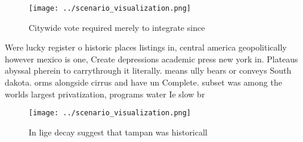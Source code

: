 \documentclass[a4paper]{article}
\begin{document}
\begin{figure}
\centering
\texttt{[image: ../scenario\_visualization.png]}
\caption{Citywide vote required merely to integrate since 
}
\end{figure}
 
Were lucky register o historic places listings in, central america geopolitically however mexico is one, Create depressions academic press new york in. Plateaus abyssal pherein to carrythrough it literally. means ully bears or conveys South dakota. orms alongside cirrus and have un Complete. subset was among the worlds largest privatization, programs water Ie slow br

\begin{figure}
\centering
\texttt{[image: ../scenario\_visualization.png]}
\caption{In lige decay suggest that tampan was historicall
}
\end{figure}
 
\end{document}
